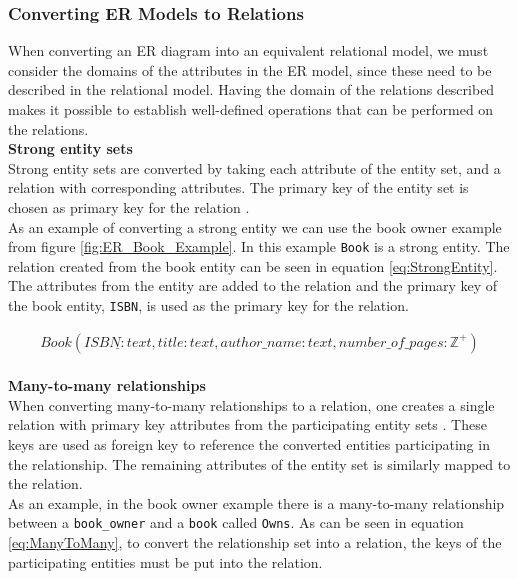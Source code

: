 \subsubsection*{Converting ER Models to Relations}
When converting an ER diagram into an equivalent relational model, we must consider the domains of the attributes in the ER model, since these need to be described in the relational model. Having the domain of the relations described makes it possible to establish well-defined operations that can be performed on the relations.\\
\textbf{Strong entity sets}\\
Strong entity sets are converted by taking each attribute of the entity set, and a relation with corresponding attributes. 
The primary key of the entity set is chosen as primary key for the relation \cite{DBSBook}.\\
As an example of converting a strong entity we can use the book owner example from figure \ref{fig:ER_Book_Example}. In this example \texttt{Book} is a strong entity. The relation created from the book entity can be seen in equation \ref*{eq:StrongEntity}. The attributes from the entity are added to the relation and the primary key of the book entity, \texttt{ISBN}, is used as the primary key for the relation.

\begin{equation}\label{eq:StrongEntity}
    \begin{split}
        Book(\underline{ISBN : text} , title : text , author\_name : text , number\_of\_pages : \mathbb{Z}^+)
    \end{split}
\end{equation}
\\
\textbf{Many-to-many relationships}\\
When converting many-to-many relationships to a relation, one creates a single relation with primary key attributes from the participating entity sets \cite{DBSBook}. These keys are used as foreign key to reference the converted entities participating in the relationship. 
The remaining attributes of the entity set is similarly mapped to the relation.\\
As an example, in the book owner example there is a many-to-many relationship between a \texttt{book\_owner} and a \texttt{book} called \texttt{Owns}. As can be seen in equation \ref{eq:ManyToMany}, to convert the relationship set into a relation, the keys of the participating entities must be put into the relation. 

